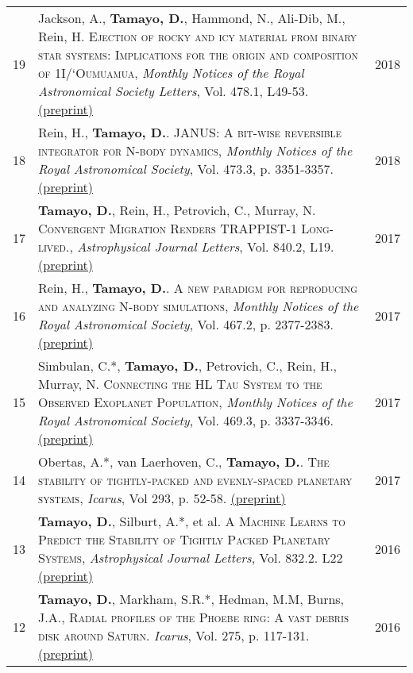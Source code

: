 \documentclass[10pt]{article} %
\begin{document}
\begin{tabular}{>{\hfill}r|p{14.3cm}l}

19 & Jackson, A., {\bf Tamayo, D.}, Hammond, N., Ali-Dib, M., Rein, H. \textsc{Ejection of rocky and icy material from binary star systems: Implications for the origin and composition of 1I/`Oumuamua}, {\it Monthly Notices of the Royal Astronomical Society Letters}, Vol. 478.1, L49-53. \href{https://arxiv.org/abs/1712.04435}{(preprint)} & 2018 \\

18 & Rein, H., {\bf Tamayo, D.}. \textsc{JANUS: A bit-wise reversible integrator for N-body dynamics}, {\it Monthly Notices of the Royal Astronomical Society}, Vol. 473.3, p. 3351-3357. \href{https://arxiv.org/abs/1704.07715}{(preprint)} & 2018 \\

17 & {\bf Tamayo, D.}, Rein, H., Petrovich, C., Murray, N. \textsc{Convergent Migration Renders TRAPPIST-1 Long-lived.}, {\it Astrophysical Journal Letters}, Vol. 840.2, L19. \href{https://arxiv.org/abs/1704.02957}{(preprint)} & 2017 \\

16 & Rein, H., {\bf Tamayo, D.}. \textsc{A new paradigm for reproducing and analyzing N-body simulations}, {\it Monthly Notices of the Royal Astronomical Society}, Vol. 467.2, p. 2377-2383. \href{https://arxiv.org/abs/1701.07423}{(preprint)} & 2017 \\

15 & Simbulan, C.*, {\bf Tamayo, D.}, Petrovich, C., Rein, H., Murray, N. \textsc{Connecting the HL Tau System to the Observed Exoplanet Population}, {\it Monthly Notices of the Royal Astronomical Society}, Vol. 469.3, p. 3337-3346. \href{https://arxiv.org/abs/1703.09132}{(preprint)} & 2017 \\

14 & Obertas, A.*, van Laerhoven, C., {\bf Tamayo, D.}. \textsc{The stability of tightly-packed and evenly-spaced planetary systems}, {\it Icarus}, Vol 293, p. 52-58. \href{https://arxiv.org/abs/1703.08426}{(preprint)} & 2017 \\

13 & {\bf Tamayo, D.}, Silburt, A.*, et al. \textsc{A Machine Learns to Predict the Stability of Tightly Packed Planetary Systems}, {\it Astrophysical Journal Letters}, Vol. 832.2. L22 \href{https://arxiv.org/abs/1610.05359}{(preprint)}& 2016 \\

12 & {\bf Tamayo, D.}, Markham, S.R.*, Hedman, M.M, Burns, J.A., \textsc{Radial profiles of the Phoebe ring: A vast debris disk around Saturn}.  {\it Icarus}, Vol. 275, p. 117-131. \href{http://arxiv.org/abs/1604.03119}{(preprint)} & 2016 \\


\end{tabular}
\end{document}

